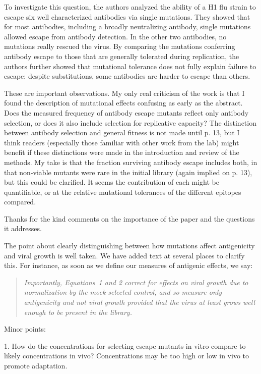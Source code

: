 \documentclass[11pt, oneside]{article}   	%
\begin{document}
To investigate this question, the authors analyzed the ability of a H1 flu strain to escape six well characterized antibodies via single mutations. They showed that for most antibodies, including a broadly neutralizing antibody, single mutations allowed escape from antibody detection. In the other two antibodies, no mutations really rescued the virus. By comparing the mutations conferring antibody escape to those that are generally tolerated during replication, the authors further showed that mutational tolerance does not fully explain failure to escape: despite substitutions, some antibodies are harder to escape than others. 

These are important observations. My only real criticism of the work is that I found the description of mutational effects confusing as early as the abstract. Does the measured frequency of antibody escape mutants reflect only antibody selection, or does it also include selection for replicative capacity? The distinction between antibody selection and general fitness is not made until p. 13, but I think readers (especially those familiar with other work from the lab) might benefit if these distinctions were made in the introduction and review of the methods. My take is that the fraction surviving antibody escape includes both, in that non-viable mutants were rare in the initial library (again implied on p. 13), but this could be clarified. It seems the contribution of each might be quantifiable, or at the relative mutational tolerances of the different epitopes compared. 

{\color{black}
Thanks for the kind comments on the importance of the paper and the questions it addresses.

The point about clearly distinguishing between how mutations affect antigenicity and viral growth is well taken.
We have added text at several places to clarify this.
For instance, as soon as we define our measures of antigenic effects, we say:
\begin{quote}
\textsl{Importantly, Equations~1 and 2 correct for effects on viral growth due to normalization by the mock-selected control, and so measure only antigenicity and not viral growth provided that the virus at least grows well enough to be present in the library.}
\end{quote}}

Minor points:

1. How do the concentrations for selecting escape mutants in vitro compare to likely concentrations in vivo? Concentrations may be too high or low in vivo to promote adaptation.
\end{document}
